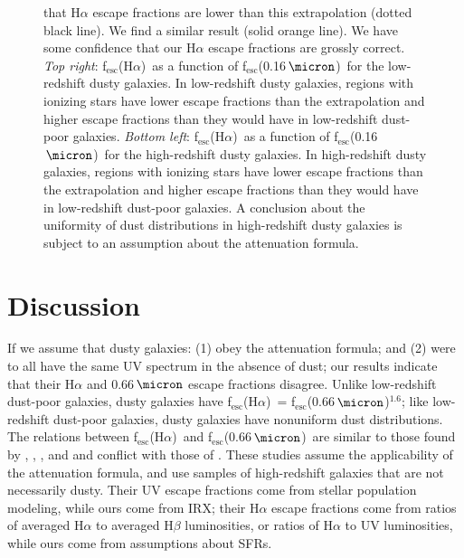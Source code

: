\documentclass[preprint]{aastex}
\newcommand{\alephuv}{f$_{\mathrm{esc}}$(0.16$\,\micron$)}
\newcommand{\alephha}{f$_{\mathrm{esc}}$(H$\alpha$)}
\newcommand{\alephuvha}{f$_{\mathrm{esc}}$(0.66$\,\micron$)}
\begin{document}
\begin{figure}[!ht]
{{that H$\alpha$ escape fractions are lower than this extrapolation (dotted black
line).  We find a similar result (solid orange line).
We have some confidence that our H$\alpha$ escape fractions are grossly
correct.
\emph{Top right}:  \alephha~as a function of \alephuv~for the low-redshift dusty
galaxies.  In
low-redshift dusty galaxies, regions with ionizing stars have lower
escape fractions than the extrapolation and higher escape fractions than they
would have in low-redshift dust-poor galaxies.
\emph{Bottom left}:  \alephha~as a function of \alephuv~for the high-redshift
dusty galaxies.  In high-redshift dusty galaxies,
regions with ionizing stars have
lower escape fractions than the extrapolation and higher escape fractions than
they would have in low-redshift dust-poor galaxies.  A conclusion about the
uniformity of dust distributions in high-redshift dusty galaxies is subject to
an assumption about the attenuation formula.\label{fha_fuv}}}
\end{figure}

\section{Discussion}\label{sec:discuss}

If we assume that dusty galaxies: (1) obey the \citet{calzetti00} attenuation
formula; and (2) were to all have the same UV spectrum in the absence of dust;
our results indicate that their H$\alpha$ and 0.66$\,\micron$ escape
fractions disagree.  Unlike low-redshift dust-poor galaxies, dusty galaxies
have \alephha~= \alephuvha$^{1.6}$; like low-redshift dust-poor galaxies,
dusty galaxies have nonuniform dust distributions.  The relations between
\alephha~and \alephuvha~are similar to those found by \citet{onodera10},
\citet{kashino13}, \citet{price13}, and \citet{reddy15} and conflict with those of
\citet{erb06}.  These studies assume the applicability of the \citet{calzetti00}
attenuation
formula, and use samples of high-redshift galaxies that are not necessarily
dusty.  Their UV escape fractions come from stellar population modeling, while
ours come from IRX; their H$\alpha$ escape fractions come from ratios of
averaged H$\alpha$ to averaged H$\beta$ luminosities, or ratios of H$\alpha$ to
UV luminosities, while ours come from assumptions about SFRs.
\end{document}
